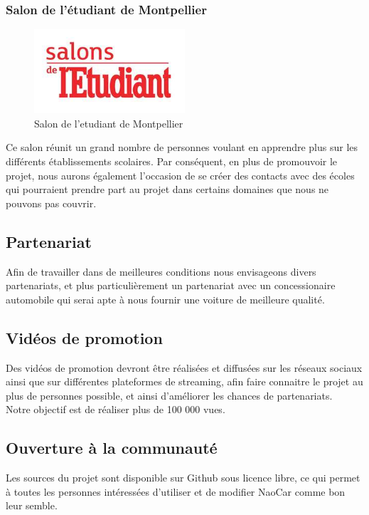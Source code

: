 \documentclass[11pt]{report} %
\begin{document}
	                \subsubsection{Salon de l'étudiant de Montpellier}
				\begin{figure}[htb]
				\centering
				\includegraphics[width=0.5\textwidth]{salon-de-l-enseignement-superieur-de-montpellier.jpg}
				\caption{Salon de l'etudiant de Montpellier}
				\label{fig:Salon de l'etudiant de Montpellier}
				\end{figure}
				Ce salon réunit un grand nombre de personnes voulant en apprendre plus sur les différents établissements scolaires. Par conséquent, en plus de promouvoir le projet, nous aurons également l'occasion de se créer des contacts avec des écoles qui pourraient prendre part au projet dans certains domaines que nous ne pouvons pas couvrir.
		\subsection{Partenariat}
			Afin de travailler dans de meilleures conditions nous envisageons divers partenariats, et plus particulièrement un partenariat avec un concessionaire automobile qui serai apte à nous fournir une voiture de meilleure qualité.
		\subsection{Vidéos de promotion}
			Des vidéos de promotion devront être réalisées et diffusées sur les réseaux sociaux ainsi que sur différentes plateformes de streaming, afin faire connaitre le projet au plus de personnes possible, et ainsi d'améliorer les chances de partenariats.\\
			Notre objectif est de réaliser plus de 100 000 vues.
		\subsection{Ouverture à la communauté}
			Les sources du projet sont disponible sur Github sous licence libre, ce qui permet à toutes les personnes intéressées d'utiliser et de modifier NaoCar comme bon leur semble.
\end{document}

